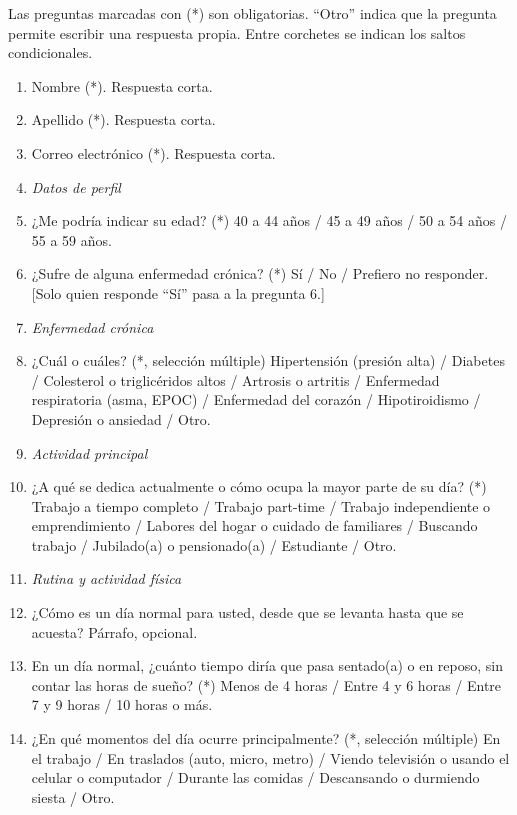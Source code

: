 \documentclass[12pt, letterpaper, table, xcdraw]{extarticle}
\begin{document}
Las preguntas marcadas con (*) son obligatorias. ``Otro'' indica que la pregunta permite escribir una respuesta propia. Entre corchetes se indican los saltos condicionales.

{\small
\begin{enumerate}[leftmargin=2em, itemsep=0.4em]
    \item Nombre (*). Respuesta corta.
    \item Apellido (*). Respuesta corta.
    \item Correo electrónico (*). Respuesta corta.

    \item[] \textit{Datos de perfil}
    \item ¿Me podría indicar su edad? (*) 40 a 44 años / 45 a 49 años / 50 a 54 años / 55 a 59 años.
    \item ¿Sufre de alguna enfermedad crónica? (*) Sí / No / Prefiero no responder. [Solo quien responde ``Sí'' pasa a la pregunta 6.]

    \item[] \textit{Enfermedad crónica}
    \item ¿Cuál o cuáles? (*, selección múltiple) Hipertensión (presión alta) / Diabetes / Colesterol o triglicéridos altos / Artrosis o artritis / Enfermedad respiratoria (asma, EPOC) / Enfermedad del corazón / Hipotiroidismo / Depresión o ansiedad / Otro.

    \item[] \textit{Actividad principal}
    \item ¿A qué se dedica actualmente o cómo ocupa la mayor parte de su día? (*) Trabajo a tiempo completo / Trabajo part-time / Trabajo independiente o emprendimiento / Labores del hogar o cuidado de familiares / Buscando trabajo / Jubilado(a) o pensionado(a) / Estudiante / Otro.

    \item[] \textit{Rutina y actividad física}
    \item ¿Cómo es un día normal para usted, desde que se levanta hasta que se acuesta? Párrafo, opcional.
    \item En un día normal, ¿cuánto tiempo diría que pasa sentado(a) o en reposo, sin contar las horas de sueño? (*) Menos de 4 horas / Entre 4 y 6 horas / Entre 7 y 9 horas / 10 horas o más.
    \item ¿En qué momentos del día ocurre principalmente? (*, selección múltiple) En el trabajo / En traslados (auto, micro, metro) / Viendo televisión o usando el celular o computador / Durante las comidas / Descansando o durmiendo siesta / Otro.


\end{enumerate}}
\end{document}
